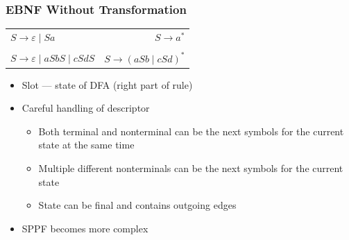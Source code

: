 \documentclass[xcolor=table,aspectratio=169]{beamer}
\begin{document}
\begin{frame}[fragile]
  \frametitle{EBNF Without Transformation}
  \begin{center}
    \begin{tabular}{l | r}
      $S \to \varepsilon \mid S a$\hspace{3cm} & \hspace{3cm} $S \to a^*$ \\
      \pause
      & \\
      $S \to \varepsilon \mid a S b S \mid c S d S$ & $S \to (a S b \mid c S d) ^ *$ \\
    \end{tabular}
  \end{center}
  \vfill
  \pause
  \begin{itemize}
    \item Slot --- state of DFA (right part of rule)
    \pause
    \item Careful handling of descriptor
    \begin{itemize}
      \item Both terminal and nonterminal can be the next symbols for the current state at the same time
      \item Multiple different nonterminals can be the next symbols for the current state
      \item State can be final and contains outgoing edges
    \end{itemize}
    \pause
    \item SPPF becomes more complex     
  \end{itemize} 
\end{frame}
\end{document}
